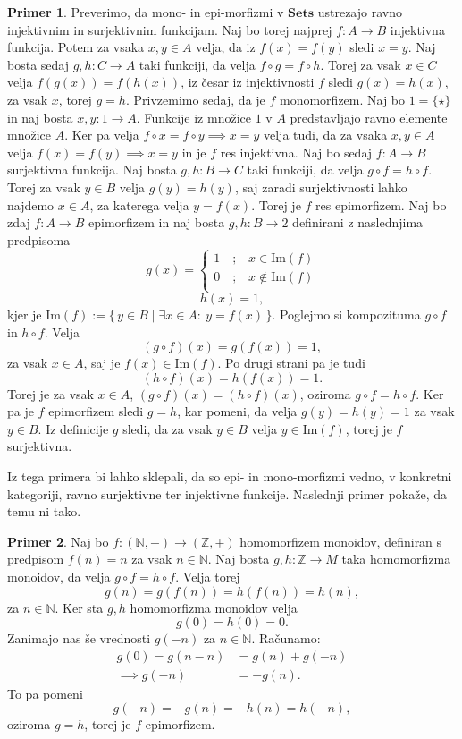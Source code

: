 \documentclass[12pt,a4paper]{book}
\theoremstyle{definition}
\theoremstyle{plain}
\theoremstyle{definition}
\newtheorem{primer}{Primer}[section]
\theoremstyle{remark}
\newcommand{\cat}[1]{\textbf{#1}}
\renewcommand{\set}[1]{\{\,#1\,\}}
\begin{document}
\begin{primer} \label{primer:mono v Set}
Preverimo, da mono- in epi-morfizmi v $\cat{Sets}$ ustrezajo ravno injektivnim in surjektivnim funkcijam. Naj bo torej najprej $f : A \to B$ injektivna funkcija. Potem za vsaka $x,y \in A$ velja, da iz $f(x) = f(y)$ sledi $x = y$. Naj bosta sedaj $g,h : C \to A$ taki funkciji, da velja $f \circ g = f \circ h$. Torej za vsak $x \in C$ velja $f(g(x)) = f(h(x))$, iz česar iz injektivnosti $f$ sledi $g(x) = h(x)$, za vsak $x$, torej $g = h$. 
Privzemimo sedaj, da je $f$ monomorfizem. Naj bo $1 = \{\star\}$ in naj bosta $x,y : 1 \to A$. Funkcije iz množice $1$ v $A$ predstavljajo ravno elemente množice $A$. Ker pa velja $f \circ x = f \circ y \implies x = y$ velja tudi, da za vsaka $x,y \in A$ velja $f(x) = f(y) \implies x = y$ in je $f$ res injektivna. Naj bo sedaj $f : A \rightarrow B$ surjektivna funkcija. Naj bosta $g,h : B \to C$ taki funkciji, da velja $g \circ f = h \circ f$. Torej za vsak $y \in B$ velja $g(y) = h(y)$, saj zaradi surjektivnosti lahko najdemo $x \in A$, za katerega velja $y = f(x)$. Torej je $f$ res epimorfizem. Naj bo zdaj $f : A \to B$ epimorfizem in naj bosta $g,h : B \to 2$ definirani z naslednjima predpisoma
\[
g(x)=
\begin{cases}
1 \quad\text{;}\quad x \in \mathrm{Im}(f) \\
0 \quad\text{;}\quad x \notin \mathrm{Im}(f) \\
\end{cases}
\]
$$ h(x) = 1,$$
kjer je $\mathrm{Im}(f) := \set{y \in B \mid \exists x \in A : \ y = f(x)}$.
Poglejmo si kompozituma $g \circ f$ in $h \circ f$. Velja 
$$(g \circ f)(x) = g(f(x)) = 1,$$
za vsak $x \in A$, saj je $f(x) \in \mathrm{Im}(f)$. Po drugi strani pa je tudi 
$$(h \circ f)(x) = h(f(x)) = 1.$$
Torej je za vsak $x \in A$, $(g \circ f)(x) = (h \circ f)(x)$, oziroma $g\circ f = h\circ f$. Ker pa je $f$ epimorfizem sledi $g = h$, kar pomeni, da velja $g(y) = h(y) = 1$ za vsak $y \in B$. Iz definicije $g$ sledi, da za vsak $y \in B$ velja $y \in \mathrm{Im}(f)$, torej je $f$ surjektivna.
\end{primer}

Iz tega primera bi lahko sklepali, da so epi- in mono-morfizmi vedno, v konkretni kategoriji, ravno surjektivne ter injektivne funkcije. Naslednji primer pokaže, da temu ni tako.

\begin{primer}
Naj bo $f : (\mathbb{N},+) \to (\mathbb{Z},+)$ homomorfizem monoidov, definiran s predpisom $f(n) = n$ za vsak $n \in \mathbb{N}$. Naj bosta $g,h: \mathbb{Z} \to M$ taka homomorfizma monoidov, da velja $g \circ f = h \circ f$. 
Velja torej
$$g(n) = g(f(n)) = h(f(n)) = h(n),$$
za $n \in \mathbb{N}$.
Ker sta $g,h$ homomorfizma monoidov velja
$$g(0) = h(0) = 0.$$
Zanimajo nas še vrednosti $g(-n)$ za $n \in \mathbb{N}$. 
Računamo:
\begin{align*}
g(0) = g(n - n) &= g(n) + g(-n) \\
\implies g(-n) &= -g(n).
\end{align*}
To pa pomeni
$$g(-n) = -g(n) = -h(n) = h(-n),$$
%
oziroma $g = h$, torej je $f$ epimorfizem.
\end{primer}
\end{document}

